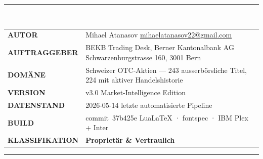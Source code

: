 \documentclass[11pt, a4paper, oneside, openany]{report}
\begin{document}
\begin{titlepage}
\vfill

\noindent\textcolor{DeepNavy}{\rule{30mm}{2pt}}\\[3mm]
\noindent\begin{tabular}{@{}p{32mm}@{\hskip 6pt}p{}@{}}
{\sffamily\fontsize{7.5}{10}\selectfont\bfseries\color{N700}\MakeUppercase{Autor}} & {\sffamily\small Mihael Atanasov \quad \textcolor{N600}{\datafont\footnotesize\href{mailto:mihaelatanasov22@gmail.com}{mihaelatanasov22@gmail.com}}} \\
{\sffamily\fontsize{7.5}{10}\selectfont\bfseries\color{N700}\MakeUppercase{Auftraggeber}} & {\sffamily\small BEKB Trading Desk, Berner Kantonalbank AG \quad \textcolor{N600}{\sffamily\footnotesize Schwarzenburgstrasse 160, 3001 Bern}} \\
{\sffamily\fontsize{7.5}{10}\selectfont\bfseries\color{N700}\MakeUppercase{Domäne}} & {\sffamily\small Schweizer OTC-Aktien — 243 ausserbörsliche Titel, 224 mit aktiver Handelshistorie} \\
{\sffamily\fontsize{7.5}{10}\selectfont\bfseries\color{N700}\MakeUppercase{Version}} & {\datafont\small v3.0 \quad \textcolor{N600}{\sffamily\footnotesize Market-Intelligence Edition}} \\
{\sffamily\fontsize{7.5}{10}\selectfont\bfseries\color{N700}\MakeUppercase{Datenstand}} & {\datafont\small 2026-05-14 \quad \textcolor{N600}{\sffamily\footnotesize letzte automatisierte Pipeline}} \\
{\sffamily\fontsize{7.5}{10}\selectfont\bfseries\color{N700}\MakeUppercase{Build}} & {\datafont\small commit~37b425e \quad \textcolor{N600}{\sffamily\footnotesize LuaLaTeX · fontspec · IBM Plex + Inter}} \\
{\sffamily\fontsize{7.5}{10}\selectfont\bfseries\color{N700}\MakeUppercase{Klassifikation}} & {\sffamily\small\bfseries\color{SwissRed}Proprietär \& Vertraulich} \\
\end{tabular}

\vspace{8mm}

\noindent\textcolor{N300}{\rule{\textwidth}{0.3pt}}\\[1.5mm]

\restoregeometry
\end{titlepage}
\end{document}
